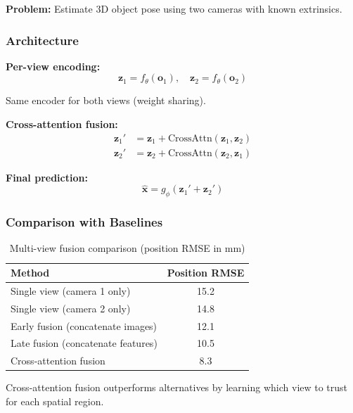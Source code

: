 \textbf{Problem:} Estimate 3D object pose using two cameras with known extrinsics.

\subsubsection{Architecture}

\textbf{Per-view encoding:}
\begin{equation}
\mathbf{z}_1 = f_\theta(\mathbf{o}_1), \quad \mathbf{z}_2 = f_\theta(\mathbf{o}_2)
\label{eq:multiview_encode}
\end{equation}

Same encoder for both views (weight sharing).

\textbf{Cross-attention fusion:}
\begin{align}
\mathbf{z}_1' &= \mathbf{z}_1 + \text{CrossAttn}(\mathbf{z}_1, \mathbf{z}_2) \\
\mathbf{z}_2' &= \mathbf{z}_2 + \text{CrossAttn}(\mathbf{z}_2, \mathbf{z}_1)
\end{align}

\textbf{Final prediction:}
\begin{equation}
\hat{\mathbf{x}} = g_\phi(\mathbf{z}_1' + \mathbf{z}_2')
\label{eq:multiview_predict}
\end{equation}

\subsubsection{Comparison with Baselines}

\begin{table}[htbp]
\centering
\caption{Multi-view fusion comparison (position RMSE in mm)}
\label{tab:multiview_comparison}
\begin{tabular}{lc}
\toprule
\textbf{Method} & \textbf{Position RMSE} \\
\midrule
Single view (camera 1 only) & 15.2 \\
Single view (camera 2 only) & 14.8 \\
Early fusion (concatenate images) & 12.1 \\
Late fusion (concatenate features) & 10.5 \\
Cross-attention fusion & 8.3 \\
\bottomrule
\end{tabular}
\end{table}

Cross-attention fusion outperforms alternatives by learning which view to trust for each spatial region.

